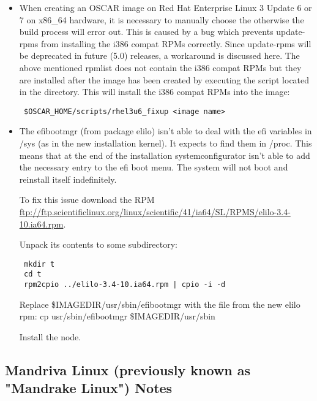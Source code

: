 \begin{itemize}

\item When creating an OSCAR image on Red Hat Enterprise Linux 3 Update 6
or 7 on x86\_64 hardware, it is necessary to manually choose the
 otherwise the build process will error
out.  This is caused by a bug which prevents update-rpms from installing
the i386 compat RPMs correctly.  Since update-rpms will be deprecated in
future (5.0) releases, a workaround is discussed here.  The above mentioned
rpmlist does not contain the i386 compat RPMs but they are installed after
the image has been created by executing the  script
located in the  directory.  This will install the
i386 compat RPMs into the image: 

\begin{verbatim}
 $OSCAR_HOME/scripts/rhel3u6_fixup <image name>
\end{verbatim}

\item The efibootmgr (from package elilo) isn't able to deal with the 
efi variables in /sys (as in the new installation kernel). It expects 
to find them in /proc. This means that at the end of the installation 
systemconfigurator isn't able to add the necessary entry to the efi 
boot menu. The system will not boot and reinstall itself indefinitely.

To fix this issue download the RPM \url{ftp://ftp.scientificlinux.org/linux/scientific/41/ia64/SL/RPMS/elilo-3.4-10.ia64.rpm}.

Unpack its contents to some subdirectory:
\begin{verbatim}
 mkdir t
 cd t
 rpm2cpio ../elilo-3.4-10.ia64.rpm | cpio -i -d
\end{verbatim}
Replace \$IMAGEDIR/usr/sbin/efibootmgr with the file from the new elilo rpm:
 cp usr/sbin/efibootmgr \$IMAGEDIR/usr/sbin

Install the node.

\end{itemize}


\subsection{Mandriva Linux (previously known as "Mandrake Linux") Notes}
\label{subsec:mdk10notes}

